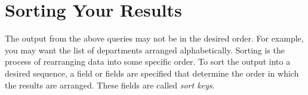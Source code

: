 %
%
%
%
%
%
%
\section{Sorting Your Results}

The output from the above queries may not be in the desired order.
For example, you may want the list of departments arranged
alphabetically.  Sorting is the process of rearranging data into some
specific order.  To sort the output into a desired sequence, a field
or fields are specified that determine the order in which the results
are arranged.  These fields are called {\em sort keys}.

